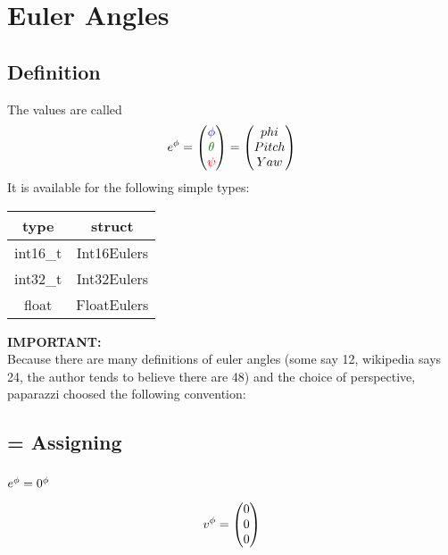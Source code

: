 \section{Euler Angles}
\subsection{Definition}
The values are called
\begin{equation}
\eu{e} = \begin{pmatrix} \Roll \\\Pitch\\\Yaw\\\end{pmatrix} = \begin{pmatrix} phi \\Pitch\\Yaw\\\end{pmatrix}
\end{equation}
It is available for the following simple types:\\
\begin{tabular}{c|c}
type		& struct		\\ \hline
int16\_t	& Int16Eulers	\\
int32\_t	& Int32Eulers	\\
float		& FloatEulers
\end{tabular}
\textbf{IMPORTANT:}\label{paparazzi euler definition}\\
Because there are many definitions of euler angles (some say 12, wikipedia says 24, the author tends to believe there are 48) and the choice of perspective, paparazzi choosed the following convention:




\subsection{= Assigning}
\subsubsection*{$e^{\phi} = 0^{\phi}$}
\begin{equation}
v^{\phi} = \begin{pmatrix} 0 \\ 0 \\ 0 \end{pmatrix}
\end{equation}

